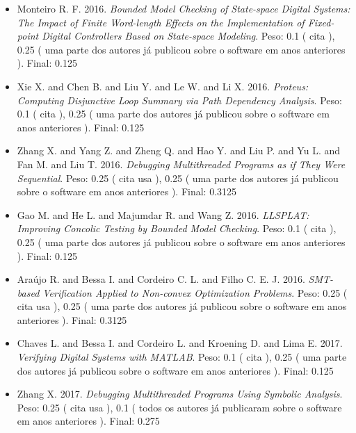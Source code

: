 \begin{itemize}
\item Monteiro R. F.
      2016.
        \textit{ Bounded Model Checking of State-space Digital Systems: The Impact of Finite Word-length Effects on the Implementation of Fixed-point Digital Controllers Based on State-space Modeling}.
      Peso:
      0.1 (
          cita
      ),
      0.25 (
uma parte dos autores já publicou sobre o software em anos anteriores
      ).
      Final:
      0.125

\item Xie X. and Chen B. and Liu Y. and Le W. and Li X.
      2016.
        \textit{ Proteus: Computing Disjunctive Loop Summary via Path Dependency Analysis}.
      Peso:
      0.1 (
          cita
      ),
      0.25 (
uma parte dos autores já publicou sobre o software em anos anteriores
      ).
      Final:
      0.125

\item Zhang X. and Yang Z. and Zheng Q. and Hao Y. and Liu P. and Yu L. and Fan M. and Liu T.
      2016.
        \textit{ Debugging Multithreaded Programs as if They Were Sequential}.
      Peso:
      0.25 (
          cita
          usa
      ),
      0.25 (
uma parte dos autores já publicou sobre o software em anos anteriores
      ).
      Final:
      0.3125

\item Gao M. and He L. and Majumdar R. and Wang Z.
      2016.
        \textit{ LLSPLAT: Improving Concolic Testing by Bounded Model Checking}.
      Peso:
      0.1 (
          cita
      ),
      0.25 (
uma parte dos autores já publicou sobre o software em anos anteriores
      ).
      Final:
      0.125

\item Araújo R. and Bessa I. and Cordeiro C. L. and Filho C. E. J.
      2016.
        \textit{ SMT-based Verification Applied to Non-convex Optimization Problems}.
      Peso:
      0.25 (
          cita
          usa
      ),
      0.25 (
uma parte dos autores já publicou sobre o software em anos anteriores
      ).
      Final:
      0.3125

\item Chaves L. and Bessa I. and Cordeiro L. and Kroening D. and Lima E.
      2017.
        \textit{ Verifying Digital Systems with MATLAB}.
      Peso:
      0.1 (
          cita
      ),
      0.25 (
uma parte dos autores já publicou sobre o software em anos anteriores
      ).
      Final:
      0.125

\item Zhang X.
      2017.
        \textit{ Debugging Multithreaded Programs Using Symbolic Analysis}.
      Peso:
      0.25 (
          cita
          usa
      ),
      0.1 (
todos os autores já publicaram sobre o software em anos anteriores
      ).
      Final:
      0.275


\end{itemize}
